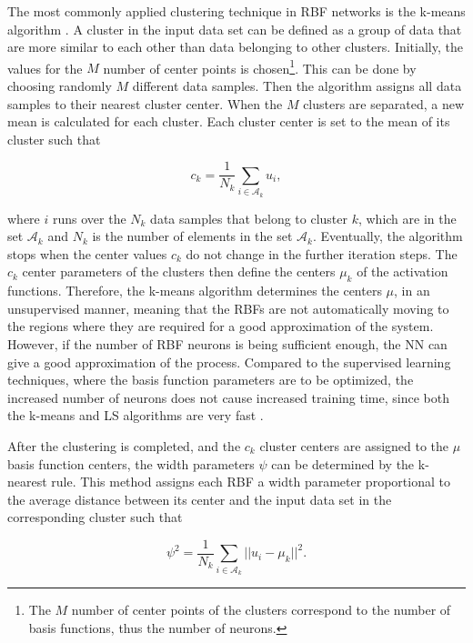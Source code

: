 The most commonly applied clustering technique in RBF networks is the k-means algorithm \cite{nelles2013nonlinear}. A cluster in the input data set can be defined as a group of data that are more similar to each other than data belonging to other clusters. Initially, the values for the $M$ number of center points is chosen\footnote{The $M$ number of center points of the clusters correspond to the number of basis functions, thus the number of neurons.}. This can be done by choosing randomly $M$ different data samples. Then the algorithm assigns all data samples to their nearest cluster center. When the $M$ clusters are separated, a new mean is calculated for each cluster. Each cluster center is set to the mean of its cluster such that

\begin{equation}
\label{cluster_center}
c_k = \frac{1}{N_k} \sum_{i \in \mathcal{A}_k}  u_i,
\end{equation}

where $i$ runs over the $N_k$ data samples that belong to cluster $k$, which are in the set $\mathcal{A}_k$ and $N_k$ is the number of elements in the set $\mathcal{A}_k$. Eventually, the algorithm stops when the center values $c_k$ do not change in the further iteration steps. The $c_k$ center parameters of the clusters then define the centers $\mu_k$ of the activation functions. Therefore, the k-means algorithm determines the centers $\mu$, in an unsupervised manner, meaning that the RBFs are not automatically moving to the regions where they are required for a good approximation of the system. However, if the number of RBF neurons is being sufficient enough, the NN can give a good approximation of the process. Compared to the supervised learning techniques, where the basis function parameters are to be optimized, the increased number of neurons does not cause increased training time, since both the k-means and LS algorithms are very fast \cite{nelles2013nonlinear}. 

After the clustering is completed, and the $c_k$ cluster centers are assigned to the $\mu$ basis function centers, the width parameters $\psi$ can be determined by the k-nearest rule. This method assigns each RBF a width parameter proportional to the average distance between its center and the input data set in the corresponding cluster such that 

 \begin{equation}
\label{cluster center}
\psi^2 = \frac{1}{N_k} \sum_{i \in \mathcal{A}_k}  ||u_i - \mu_k||^2.
\end{equation}


